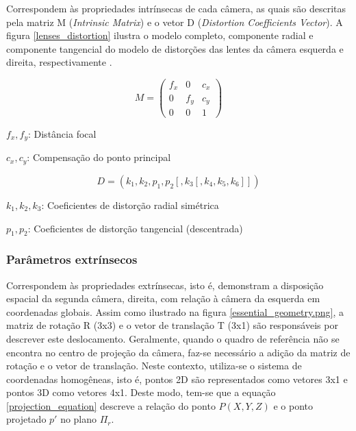 Correspondem às propriedades intrínsecas de cada câmera, as quais são descritas pela matriz M (\textit{Intrinsic Matrix}) e o vetor D (\textit{Distortion Coefficients Vector}). A figura \ref{lenses_distortion} ilustra o modelo completo, componente radial e componente tangencial do modelo de distorções das lentes da câmera esquerda e direita, respectivamente \cite{OpenCVCalibrationModule}.

\begin{equation}
 M = \begin{pmatrix}
f_x & 0   & c_x\\ 
  0 & f_y & c_y\\ 
  0 & 0   & 1
\end{pmatrix}
\end{equation}

\begin{center}
  $f_x,f_y$: Distância focal
  
  $c_x,c_y$: Compensação do ponto principal
\end{center}

\begin{equation}
  D = (k_1,k_2,p_1,p_2[,k_3[,k_4,k_5,k_6]])
\end{equation}

\begin{center}
  $k_1,k_2,k_3$: Coeficientes de distorção radial simétrica
  
  $p_1,p_2$: Coeficientes de distorção tangencial (descentrada)
\end{center}

\subsubsection{Parâmetros extrínsecos}
Correspondem às propriedades extrínsecas, isto é, demonstram a disposição espacial da segunda câmera, direita, com relação à câmera da esquerda em coordenadas globais. Assim como ilustrado na figura \ref{essential_geometry.png}, a matriz de rotação R (3x3) e o vetor de translação T (3x1) são responsáveis por descrever este deslocamento. Geralmente, quando o quadro de referência não se encontra no centro de projeção da câmera, faz-se necessário a adição da matriz de rotação e o vetor de translação. Neste contexto, utiliza-se o sistema de coordenadas homogêneas, isto é, pontos 2D são representados como vetores 3x1 e pontos 3D como vetores 4x1. Deste modo, tem-se que a equação \ref{projection_equation} descreve a relação do ponto $P(X,Y,Z)$ e o ponto projetado $p'$ no plano $\Pi_r$\cite{RobertLaganiere}.

